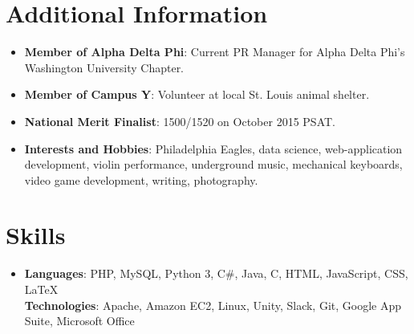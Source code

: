 \documentclass[letterpaper,11pt]{article}
\newcommand{\resumeItem}[2]{
  \item\small{
    \textbf{#1}{: #2 \vspace{-2pt}}
  }
}
\newcommand{\resumeSubItem}[2]{\resumeItem{#1}{#2}\vspace{-4pt}}
\newcommand{\resumeSubHeadingListStart}{\begin{itemize}[leftmargin=*]}
\newcommand{\resumeSubHeadingListEnd}{\end{itemize}}
\begin{document}
\section{Additional Information}

	\resumeSubHeadingListStart
		\resumeSubItem{Member of Alpha Delta Phi}
		{Current PR Manager for Alpha Delta Phi's Washington University Chapter.}
		\resumeSubItem{Member of Campus Y}{Volunteer at local St. Louis animal shelter.}
		\resumeSubItem{National Merit Finalist}
		{1500/1520 on October 2015 PSAT.}
		\resumeSubItem{Interests and Hobbies}
		{Philadelphia Eagles, data science, web-application development, violin performance, underground music, mechanical keyboards, video game development,  writing, photography.}

	\resumeSubHeadingListEnd
	
\section{Skills}
 \resumeSubHeadingListStart
    \item{
      \textbf{Languages}{: PHP, MySQL, Python 3, C\#, Java, C, HTML, JavaScript, CSS, LaTeX}
      \hfill
      \\
      \textbf{Technologies}{: Apache, Amazon EC2, Linux, Unity, Slack, Git, Google App Suite, Microsoft Office}
    }
  \resumeSubHeadingListEnd
\end{document}
